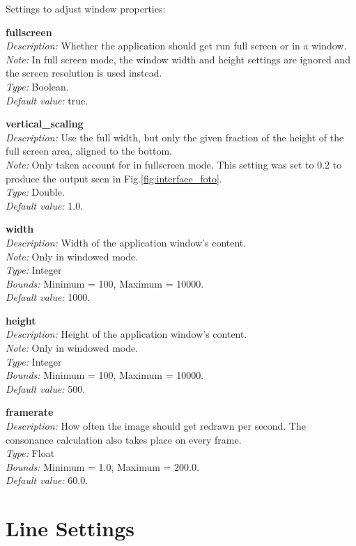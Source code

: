 \documentclass[12pt,a4paper,titlepage,oneside]{report}
\begin{document}
Settings to adjust window properties:

\noindent
\textbf{fullscreen} \\
\emph{Description:} Whether the application should get run full screen or in a window. \\
\emph{Note:} In full screen mode, the window width and height settings are ignored and the screen resolution is used instead. \\
\emph{Type:} Boolean. \\
\emph{Default value:} true.

\noindent
\textbf{vertical\_scaling} \\
\emph{Description:} Use the full width, but only the given fraction of the height of the full screen area, aligned to the bottom. \\
\emph{Note:} Only taken account for in fullscreen mode. This setting was set to 0.2 to produce the output seen in Fig.\ref{fig:interface_foto}. \\
\emph{Type:} Double. \\
\emph{Default value:} 1.0.

\noindent
\textbf{width} \\
\emph{Description:} Width of the application window's content. \\
\emph{Note:} Only in windowed mode. \\
\emph{Type:} Integer \\
\emph{Bounds:} Minimum = 100, Maximum = 10000. \\
\emph{Default value:} 1000.

\noindent
\textbf{height} \\
\emph{Description:} Height of the application window's content. \\
\emph{Note:} Only in windowed mode. \\
\emph{Type:} Integer \\
\emph{Bounds:} Minimum = 100, Maximum = 10000. \\
\emph{Default value:} 500.

\noindent
\textbf{framerate} \\
\emph{Description:} How often the image should get redrawn per second. The consonance calculation also takes place on every frame. \\
\emph{Type:} Float \\
\emph{Bounds:} Minimum = 1.0, Maximum = 200.0. \\
\emph{Default value:} 60.0.


\section{Line Settings}
\end{document}

